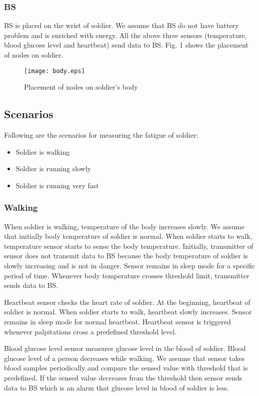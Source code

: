 \documentclass[journal]{IEEEtran}
\begin{document}
\subsubsection{BS}
BS is placed on the wrist of soldier. We assume that BS do not have battery problem and is enriched with energy. All the above three sensors (temperature, blood
 glucose level and heartbeat) send data to BS. Fig. 1 shows the placement of nodes on soldier.
\begin{figure} [!ht]
\centering
\texttt{[image: body.eps]}
\caption{Placement of nodes on soldier's body}
\end{figure}

\subsection{Scenarios}
Following are the scenarios for measuring the fatigue of soldier:

\begin{itemize}
\renewcommand{\labelitemi}{$\rightarrow$}
\item Soldier is walking
\item Soldier is running slowly
\item Soldier is running very fast
\end{itemize}

\subsubsection{Walking}
When soldier is walking, temperature of the body increases slowly. We assume that initially body temperature of soldier is normal. When soldier starts to walk,
temperature sensor starts to sense the body temperature. Initially, transmitter of sensor does not transmit data to BS because the body temperature of soldier is
slowly increasing and is not in danger. Sensor remains in sleep mode for a specific period of time. Whenever body temperature crosses threshold limit, transmitter
sends data to BS.

Heartbeat sensor checks the heart rate of soldier. At the beginning, heartbeat of soldier is normal. When soldier starts to walk, heartbeat slowly increases.
Sensor remains in sleep mode for normal heartbeat. Heartbeat sensor is triggered whenever palpitations cross a predefined threshold level.

Blood glucose level sensor measures glucose level in the blood of soldier. Blood glucose level of a person decreases while walking. We assume that sensor takes
blood samples periodically and compare the sensed value with threshold that is predefined. If the sensed value decreases from the threshold then sensor sends data
to BS which is an alarm that glucose level in blood of soldier is less.
\end{document}
